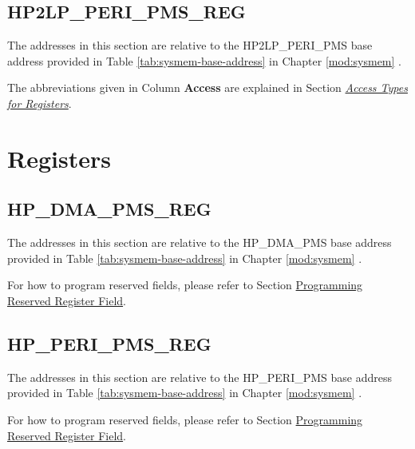 \documentclass[main\_\_EN.tex]{subfiles}
\begin{document}


\subsection{HP2LP\_PERI\_PMS\_REG}
\label{sec:permctrl-reg-hp2lp}

The addresses in this section are relative to the HP2LP\_PERI\_PMS base address provided in Table \ref{tab:sysmem-base-address} in Chapter \ref{mod:sysmem} \textit{}.

The abbreviations given in Column \textbf{Access} are explained in Section \hyperref[glossary-access-types]{\textit{Access Types for Registers}}.




\clearpage
\section{Registers}

\subsection{HP\_DMA\_PMS\_REG}

The addresses in this section are relative to the HP\_DMA\_PMS base address provided in Table \ref{tab:sysmem-base-address} in Chapter \ref{mod:sysmem} \textit{}.

For how to program reserved fields, please refer to Section \hyperref[programming-reserved-field]{Programming Reserved Register Field}.



\subsection{HP\_PERI\_PMS\_REG}

The addresses in this section are relative to the HP\_PERI\_PMS base address provided in Table \ref{tab:sysmem-base-address} in Chapter \ref{mod:sysmem} \textit{}.

For how to program reserved fields, please refer to Section \hyperref[programming-reserved-field]{Programming Reserved Register Field}.
\end{document}
